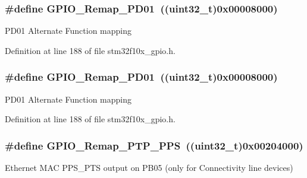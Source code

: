 \subsubsection[{\texorpdfstring{G\+P\+I\+O\+\_\+\+Remap\+\_\+\+P\+D01}{GPIO_Remap_PD01}}]{\setlength{\rightskip}{0pt plus 5cm}\#define G\+P\+I\+O\+\_\+\+Remap\+\_\+\+P\+D01~(({\bf uint32\+\_\+t})0x00008000)}\hypertarget{group___g_p_i_o___remap__define_gaeac44191de99d55a5fa03e29b74d5e59}{}\label{group___g_p_i_o___remap__define_gaeac44191de99d55a5fa03e29b74d5e59}
P\+D01 Alternate Function mapping 

Definition at line 188 of file stm32f10x\+\_\+gpio.\+h.

\subsubsection[{\texorpdfstring{G\+P\+I\+O\+\_\+\+Remap\+\_\+\+P\+D01}{GPIO_Remap_PD01}}]{\setlength{\rightskip}{0pt plus 5cm}\#define G\+P\+I\+O\+\_\+\+Remap\+\_\+\+P\+D01~(({\bf uint32\+\_\+t})0x00008000)}\hypertarget{group___g_p_i_o___remap__define_gaeac44191de99d55a5fa03e29b74d5e59}{}\label{group___g_p_i_o___remap__define_gaeac44191de99d55a5fa03e29b74d5e59}
P\+D01 Alternate Function mapping 

Definition at line 188 of file stm32f10x\+\_\+gpio.\+h.

\subsubsection[{\texorpdfstring{G\+P\+I\+O\+\_\+\+Remap\+\_\+\+P\+T\+P\+\_\+\+P\+PS}{GPIO_Remap_PTP_PPS}}]{\setlength{\rightskip}{0pt plus 5cm}\#define G\+P\+I\+O\+\_\+\+Remap\+\_\+\+P\+T\+P\+\_\+\+P\+PS~(({\bf uint32\+\_\+t})0x00204000)}\hypertarget{group___g_p_i_o___remap__define_ga3e9d7808d1e50393afde08e4a45d18aa}{}\label{group___g_p_i_o___remap__define_ga3e9d7808d1e50393afde08e4a45d18aa}
Ethernet M\+AC P\+P\+S\+\_\+\+P\+TS output on P\+B05 (only for Connectivity line devices) 

